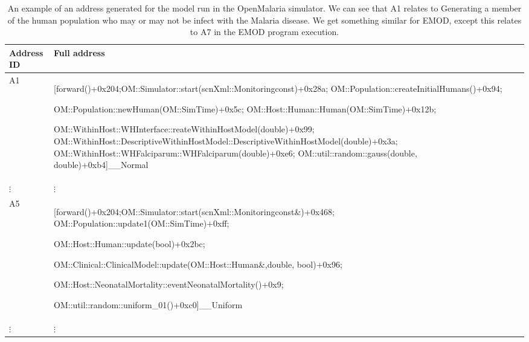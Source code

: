 \documentclass{article}
\begin{document}
\begin{table}[h!]
\footnotesize
  \setlength{\tabcolsep}{1mm}
\label{table:asingleaddress}
  \caption{An example of an address generated for the model run in the OpenMalaria simulator. We can see that A1
  relates to Generating a member of the human population who may or may not be infect with the Malaria disease. We get something similar for EMOD, except this relates to A7 in the EMOD program execution.}
  \def\arraystretch{1.25}
  \begin{tabularx}{\textwidth}{@{}lX@{}l@{}} 
    \toprule
    Address ID & Full address \\
    \midrule
  A1 & [forward()+0x204;OM::Simulator::start(scnXml::Monitoringconst)+0x28a;
  OM::Population::createInitialHumans()+0x94;

  OM::Population::newHuman(OM::SimTime)+0x5c;
  OM::Host::Human::Human(OM::SimTime)+0x12b;

  OM::WithinHost::WHInterface::reateWithinHostModel(double)+0x99;
  OM::WithinHost::DescriptiveWithinHostModel::DescriptiveWithinHostModel(double)+0x3a;
  OM::WithinHost::WHFalciparum::WHFalciparum(double)+0xe6;
  OM::util::random::gauss(double, double)+0xb4]\_\_Normal \\

  $\vdots$ & $\vdots$ \\

  A5 & [forward()+0x204;OM::Simulator::start(scnXml::Monitoringconst\&)+0x468;
  OM::Population::update1(OM::SimTime)+0xff;

  OM::Host::Human::update(bool)+0x2bc;

  OM::Clinical::ClinicalModel::update(OM::Host::Human\&,double, bool)+0x96;

  OM::Host::NeonatalMortality::eventNeonatalMortality()+0x9;

  OM::util::random::uniform\_01()+0xc0]\_\_Uniform\\
  $\vdots$ & $\vdots$ \\


\bottomrule
  \end{tabularx}
  \end{table}
\end{document}
